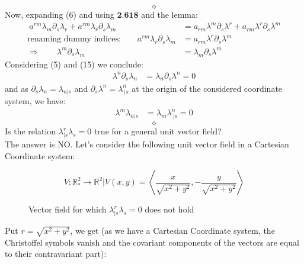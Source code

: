 $$\diamond$$
Now, expanding (6) and using $\textbf{2.618}$ and the lemma:
\begin{align}
\ a^{rm}\lambda_m\partial_s \lambda_r+ a^{rm} \lambda_r \partial_s \lambda_m &= a_{rm} \lambda^m \partial_s \lambda^r + a_{rm} \lambda^r \partial_s \lambda^m\\
\text{renaming dummy indices:}\quad\quad   a^{rm} \lambda_r \partial_s \lambda_m &= a_{rm} \lambda^r \partial_s \lambda^m \\
\Rightarrow\quad\quad \lambda^m \partial_s \lambda_m &= \lambda_m \partial_s \lambda^m
\end{align}
Considering (5) and (15) we conclude:
\begin{align}
\lambda^n \partial_s \lambda_n &= \lambda_n \partial_s \lambda^n = 0
\end{align}
and as $\partial_s \lambda_n = \lambda_{n|s} $ and $\partial_s \lambda^n = \lambda^n_{\ |s} $ at the origin of the considered coordinate system, we have:
\begin{align}
\lambda^m \lambda_{n|s} &= \lambda_m \lambda^n_{\ |s} = 0
\end{align}
$$\diamond$$
Is the relation $\lambda^r_{|s}\lambda_s = 0$ true for a general unit vector field?\\
The answer is NO. Let's consider the following unit vector field in a Cartesian Coordinate system:
\begin{figure}[H]

\centering
\begin{minipage}[H]{.4\textwidth}

\vspace{0pt}

\end{minipage}\hfill
\begin{minipage}[H]{0.4\textwidth}
\vspace{50pt}
$$V:\mathbb{R}_*^2\rightarrow \mathbb{R}^2|V(x,y) = \left< \frac{x}{\sqrt{x^2+y^2}},-\frac{y}{\sqrt{x^2+y^2}} \right>$$
\end{minipage}
\caption{Vector field for which $\lambda^r_{|s}\lambda_s = 0$ does not hold}
\label{fig:fig_p62_236_a}
\end{figure}
Put $ r = \sqrt{x^2+y^2}$, we get (as we have a Cartesian Coordinate system, the  Christoffel symbols vanish and the covariant components of the vectors are equal to their contravariant part):
\newpage
